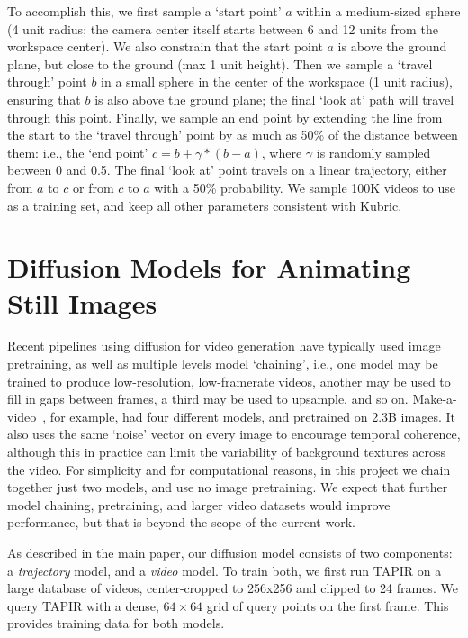 \documentclass[10pt,twocolumn,letterpaper]{article}
\begin{document}
To accomplish this, we first sample a `start point' $a$ within a medium-sized sphere (4 unit radius; the camera center itself starts between 6 and 12 units from the workspace center).  We also constrain that the start point $a$ is above the ground plane, but close to the ground (max 1 unit height).  Then we sample a `travel through' point $b$ in a small sphere in the center of the workspace (1 unit radius), ensuring that $b$ is also above the ground plane; the final `look at' path will travel through this point. Finally, we sample an end point by extending the line from the start to the `travel through' point by as much as 50\% of the distance between them: i.e., the `end point' $c=b+\gamma*(b-a)$, where $\gamma$ is randomly sampled between 0 and 0.5.  The final `look at' point travels on a linear trajectory, either from $a$ to $c$ or from $c$ to $a$ with a 50\% probability.  We sample 100K videos to use as a training set, and keep all other parameters consistent with Kubric.


\section{Diffusion Models for Animating Still Images}

Recent pipelines using diffusion for video generation have typically used image pretraining, as well as multiple levels model `chaining', i.e., one model may be trained to produce low-resolution, low-framerate videos, another may be used to fill in gaps between frames, a third may be used to upsample, and so on.  Make-a-video~\cite{singer2022make}, for example, had four different models, and pretrained on 2.3B images.  It also uses the same `noise' vector on every image to encourage temporal coherence, although this in practice can limit the variability of background textures across the video.  For simplicity and for computational reasons, in this project we chain together just two models, and use no image pretraining.  We expect that further model chaining, pretraining, and larger video datasets would improve performance, but that is beyond the scope of the current work.  

As described in the main paper, our diffusion model consists of two components: a \emph{trajectory} model, and a \emph{video} model.  To train both, we first run TAPIR on a large database of videos, center-cropped to 256x256 and clipped to 24 frames.  We query TAPIR with a dense, $64\times 64$ grid of query points on the first frame.  This provides training data for both models.
\end{document}
